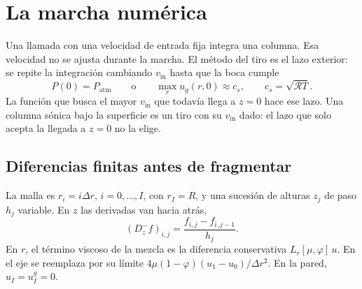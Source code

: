 \documentclass[11pt,a4paper]{article}
\newcommand{\Rv}{\mathcal{R}}
\theoremstyle{plain}
\theoremstyle{definition}
\theoremstyle{remark}
\begin{document}
\section{La marcha numérica}
\label{sec:marcha}

Una llamada con una velocidad de entrada fija integra una columna.
Esa velocidad no se ajusta durante la marcha. El método del tiro es el
lazo exterior: se repite la integración cambiando \(v_{\mathrm{in}}\) hasta
que la boca cumple
\begin{equation}
P(0)=P_{\mathrm{atm}}
\qquad\text{o}\qquad
\max_r u_g(r,0)\approx c_s,
\qquad
c_s=\sqrt{\Rv T}.
\label{eq:boca}
\end{equation}
La función que busca el mayor \(v_{\mathrm{in}}\) que todavía llega a
\(z=0\) hace ese lazo. Una columna sónica bajo la superficie es un tiro
con su \(v_{\mathrm{in}}\) dado: el lazo que solo acepta la llegada a
\(z=0\) no la elige.

\subsection{Diferencias finitas antes de fragmentar}

La malla es \(r_i=i\Delta r\), \(i=0,\ldots,I\), con \(r_I=R\), y una
sucesión de alturas \(z_j\) de paso \(h_j\) variable. En \(z\) las
derivadas van hacia atrás,
\begin{equation}
(D_z^- f)_{i,j}=\frac{f_{i,j}-f_{i,j-1}}{h_j}.
\label{eq:Dz}
\end{equation}
En \(r\), el término viscoso de la mezcla es la diferencia conservativa
\(L_r[\mu,\varphi]\,u\). En el eje se reemplaza por su límite
\(4\mu(1-\varphi)(u_1-u_0)/\Delta r^2\). En la pared, \(u_I=u^g_I=0\).
\end{document}
